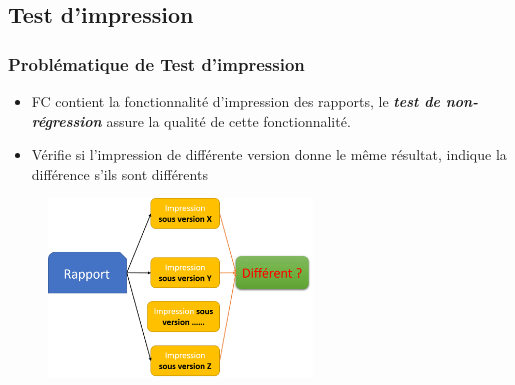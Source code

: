 \documentclass{beamer}
\begin{document}
        \subsection{Test d'impression}
        
        \begin{frame}
            \frametitle{Problématique de Test d'impression}
            \begin{itemize}
                \item FC contient la fonctionnalité d'impression des rapports,  le \textit{\textbf{test de non-régression}} assure la qualité de cette fonctionnalité.
                \pause
                \item Vérifie si l'impression de différente version donne le même résultat, indique la différence s'ils sont différents
            \end{itemize}
             
            \begin{figure}[H]
                \centering
                \includegraphics[width=7cm]{problematique_print.png}
                \label{fig:problem_print}
            \end{figure}
                
        \end{frame}
        
\end{document}

